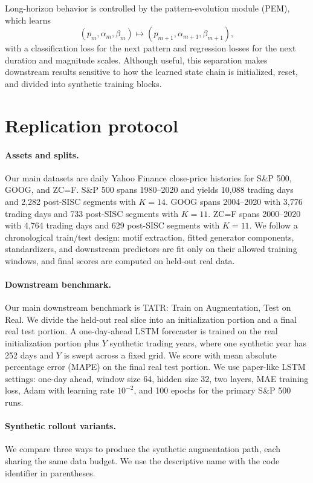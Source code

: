\documentclass{article}
\begin{document}
Long-horizon behavior is controlled by the pattern-evolution module (PEM), which learns
\begin{equation}
  (p_m,\alpha_m,\beta_m) \mapsto (p_{m+1},\alpha_{m+1},\beta_{m+1}),
\end{equation}
with a classification loss for the next pattern and regression losses for the next duration and magnitude scales. Although useful, this separation makes downstream results sensitive to how the learned state chain is initialized, reset, and divided into synthetic training blocks.

\section{Replication protocol}

\paragraph{Assets and splits.}
Our main datasets are daily Yahoo Finance close-price histories for S\&P 500, GOOG, and ZC=F. S\&P 500 spans 1980--2020 and yields 10,088 trading days and 2,282 post-SISC segments with $K=14$. GOOG spans 2004--2020 with 3,776 trading days and 733 post-SISC segments with $K=11$. ZC=F spans 2000--2020 with 4,764 trading days and 629 post-SISC segments with $K=11$. We follow a chronological train/test design: motif extraction, fitted generator components, standardizers, and downstream predictors are fit only on their allowed training windows, and final scores are computed on held-out real data.

\paragraph{Downstream benchmark.}
Our main downstream benchmark is TATR: Train on Augmentation, Test on Real. We divide the held-out real slice into an initialization portion and a final real test portion. A one-day-ahead LSTM forecaster is trained on the real initialization portion plus $Y$ synthetic trading years, where one synthetic year has 252 days and $Y$ is swept across a fixed grid. We score with mean absolute percentage error (MAPE) on the final real test portion. We use paper-like LSTM settings: one-day ahead, window size 64, hidden size 32, two layers, MAE training loss, Adam with learning rate $10^{-2}$, and 100 epochs for the primary S\&P 500 runs.

\paragraph{Synthetic rollout variants.}
We compare three ways to produce the synthetic augmentation path, each sharing the same data budget. We use the descriptive name with the code identifier in parentheses.
\end{document}
